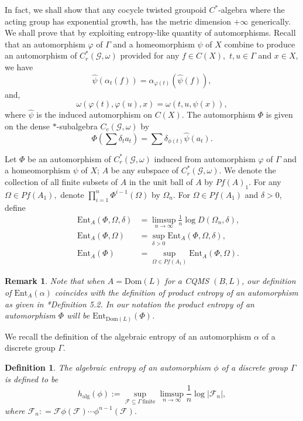\documentclass[a4paper,11pt,reqno]{amsart}
\theoremstyle{plain}
\newtheorem{defn}[thm]{Definition}
\newtheorem{rem}[thm]{Remark}
\theoremstyle{mainthmstyle}
\theoremstyle{named}
\numberwithin{equation}{section}
\begin{document}
In fact, we shall show that any cocycle twisted groupoid $C^{\ast}$-algebra where the acting group has exponential growth, has the metric dimension $+\infty$ generically. We shall prove that by exploiting entropy-like quantity of automorphisms. Recall that an automorphism $\varphi$ of $\Gamma$ and a homeomorphism $\psi$ of $X$ combine to produce an automorphism of $C^{\ast}_{r}(\mathcal{G},\omega)$ provided for any $f \in C(X),$ $t, u \in \Gamma$ and $x \in X,$ we have
$$\hat{\psi}(\alpha_t (f)) = \alpha_{\varphi(t)}(\hat{\psi}(f)),$$ and,
$$\omega (\varphi (t), \varphi (u), x) = \omega (t, u, \psi (x)),$$
where $\hat{\psi}$ is the induced automorphism on $C(X)$. The automorphism $\Phi$ is given on the dense $\ast$-subalgebra $C_{c}(\mathcal{G},\omega)$ by
\begin{displaymath}
    \Phi(\sum\delta_{t}a_{t})=\sum\delta_{\phi(t)}\hat{\psi}(a_{t}).
\end{displaymath}

\vspace{2mm}

Let $\Phi$ be an automorphism of $C^{\ast}_{r}(\mathcal{G},\omega)$ induced from automorphism $\varphi$ of $\Gamma$ and a homeomorphism $\psi$ of $X$; $A$ be any subspace of $C^{\ast}_{r}(\mathcal{G},\omega)$. We denote the collection of all finite subsets of $A$ in the unit ball of $A$ by $Pf(A)_{1}$. For any $\Omega\in Pf(A_1),$ denote $\prod\limits_{i=1}^{n} \Phi^{i - 1}(\Omega)$ by $\Omega_{n}.$ For $\Omega\in Pf(A_{1})$ and $\delta>0$, define
    \begin{align*}
&&\mathrm{Ent}_{A} (\Phi,\Omega,\delta) & =  \limsup\limits_{n\to\infty}\frac{1}{n}\log D \left (\Omega_n,\delta \right ),\\
&&\mathrm{Ent}_{A}(\Phi,\Omega) & = \sup_{\delta>0}\mathrm{Ent}_{A}(\Phi,\Omega,\delta),\\
&&\mathrm{Ent}_{A}(\Phi) & =  \sup_{\Omega \in Pf(A_1)}\mathrm{Ent}_{A}(\Phi,\Omega).
\end{align*}
\begin{rem}
    Note that when $A=\mathrm{Dom}(L)$ for a CQMS $(B,L)$, our definition of $\mathrm{Ent}_{A}(\alpha)$ coincides with the definition of product entropy of an automorphism as given in \cite{Kerr}*{Definition 5.2}. In our notation the product entropy of an automorphism $\Phi$ will be $\mathrm{Ent}_{\mathrm{Dom}(L)}(\Phi)$. 
\end{rem}
We recall the definition of the algebraic entropy of an automorphism $\alpha$ of a discrete group $\Gamma.$
\begin{defn}\label{algentp}
The algebraic entropy of an automorphism $\phi$ of a discrete group $\Gamma$ is defined to be
\begin{displaymath}
 h_{\mathrm{alg}}(\phi):=\sup_{\mathcal{F}\subseteq\Gamma \ \textrm{finite}}\limsup\limits_{n\to\infty}\frac{1}{n}\log\lvert\mathcal{F}_n\rvert,
\end{displaymath}
where $\mathcal F_n : = \mathcal{F}\phi(\mathcal{F}) \cdots \phi^{n-1} (\mathcal F).$
\end{defn}
\end{document}
